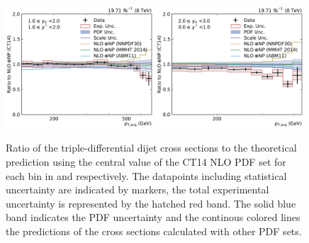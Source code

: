 \begin{figure}[htbp]
    \includegraphics[width=0.49\textwidth]{figures/measurement/ratio_to_CT14nlo+np_totcomp_yb1ys1.pdf}\hfill
    \includegraphics[width=0.49\textwidth]{figures/measurement/ratio_to_CT14nlo+np_totcomp_yb2ys0.pdf}
    \caption[Ratio of the cross section to CT14 NLO]{
    Ratio of the triple-differential dijet cross sections to the theoretical
    prediction using the central value of the CT14 NLO PDF set for each bin in \ystar
    and \yboost respectively. The datapoints including statistical uncertainty are
    indicated by markers, the total experimental uncertainty is represented by the
    hatched red band. The solid blue band indicates the PDF uncertainty and the
    continous colored lines the predictions of the cross sections calculated with
    other PDF sets. }
    \label{fig:ratio_ct14_nlo}
\end{figure}

